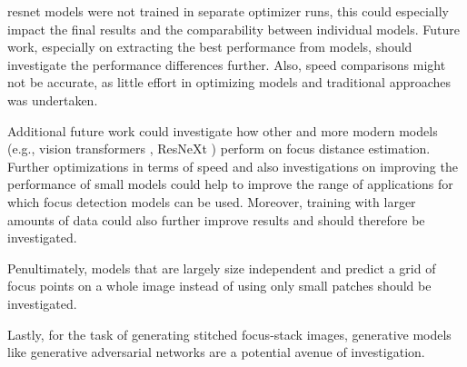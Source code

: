 \Ac{resnet} models were not trained in separate optimizer runs, this could especially impact the final results and the comparability between individual models. Future work, especially on extracting the best performance from models, should investigate the performance differences further. 
Also, speed comparisons might not be accurate, as little effort in optimizing models and traditional approaches was undertaken.

Additional future work could investigate how other and more modern models (e.g., vision transformers \cite{dosovitskiy2021image}, ResNeXt \cite{xie2017aggregated}) perform on focus distance estimation. Further optimizations in terms of speed and also investigations on improving the performance of small models could help to improve the range of applications for which focus detection models can be used.
Moreover, training with larger amounts of data could also further improve results and should therefore be investigated.

Penultimately, models that are largely size independent and predict a grid of focus points on a whole image instead of using only small patches should be investigated.

Lastly, for the task of generating stitched focus-stack images, generative models like generative adversarial networks \cite{goodfellow2014generative} are a potential avenue of investigation.